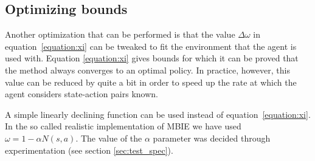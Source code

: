 \subsection{Optimizing bounds}

Another optimization that can be performed is that the value $\Delta \omega$ in
equation~\eqref{equation:xi} can be tweaked to fit the environment that the agent
is used with. Equation \eqref{equation:xi} gives bounds for which it can be
proved that the method always converges to an optimal policy. In practice,
however, this value can be reduced by quite a bit in order to speed up the rate
at which the agent considers state-action pairs known. 

A simple linearly declining function can be used instead of
equation~\eqref{equation:xi}. In the so called realistic implementation of MBIE we have
used $\omega = 1 - \alpha N(s,a).$ The value of the $\alpha$ parameter was decided through experimentation (see section \ref{sec:test_spec}).
